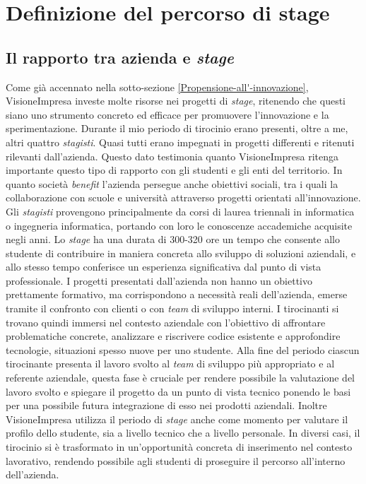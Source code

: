 \chapter{Definizione del percorso di stage}
\label{chap:Definizione-del-percorso-di-stage}

\section{Il rapporto tra azienda e \textit{stage}}
Come già accennato nella sotto-sezione \ref{Propensione-all'-innovazione}, VisioneImpresa investe molte risorse nei progetti di \textit{stage}, ritenendo che questi siano uno strumento concreto ed efficace per promuovere l'innovazione e la sperimentazione.
Durante il mio periodo di tirocinio erano presenti, oltre a me, altri quattro \textit{stagisti}. Quasi tutti erano impegnati in progetti differenti e ritenuti rilevanti dall'azienda. Questo dato testimonia quanto VisioneImpresa ritenga importante questo tipo di rapporto con gli studenti e gli enti del territorio. In quanto società \textit{benefit} l'azienda persegue anche obiettivi sociali, tra i quali la collaborazione con scuole e università attraverso progetti orientati all'innovazione.
Gli \textit{stagisti} provengono principalmente da corsi di laurea triennali in informatica o ingegneria informatica, portando con loro le conoscenze accademiche acquisite negli anni. Lo \textit{stage} ha una durata di 300-320 ore un tempo che consente allo studente di contribuire in maniera concreta allo sviluppo di soluzioni aziendali, e allo stesso tempo conferisce un esperienza significativa dal punto di vista professionale.
I progetti presentati dall'azienda non hanno un obiettivo prettamente formativo, ma corrispondono a necessità reali dell'azienda, emerse tramite il confronto con clienti o con \textit{team} di sviluppo interni. I tirocinanti si trovano quindi immersi nel contesto aziendale con l'obiettivo di affrontare problematiche concrete, analizzare e riscrivere codice esistente e approfondire tecnologie, situazioni spesso nuove per uno studente.
Alla fine del periodo ciascun tirocinante presenta il lavoro svolto al \textit{team} di sviluppo più appropriato e al referente aziendale, questa fase è cruciale per rendere possibile la valutazione del lavoro svolto e spiegare il progetto da un punto di vista tecnico ponendo le basi per una possibile futura integrazione di esso nei prodotti aziendali.
Inoltre VisioneImpresa utilizza il periodo di \textit{stage} anche come momento per valutare il profilo dello studente, sia a livello tecnico che a livello personale. In diversi casi, il tirocinio si è trasformato in un'opportunità concreta di inserimento nel contesto lavorativo, rendendo possibile agli studenti di proseguire il percorso all'interno dell'azienda.



